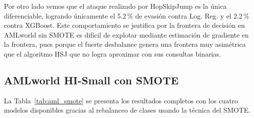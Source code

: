 Por otro lado vemos que el ataque realizado por HopSkipJump es la única diferenciable, logrando únicamente el 5.2\,\% de evasión contra Log. Reg. y el 2.2\,\% contra XGBoost. Este comportamiento se jsutifica por la frontera de decisión en AMLworld sin SMOTE es difícil de explotar mediante estimación de gradiente en la frontera, pues porque el fuerte desbalance genera una frontera muy asimétrica que el algoritmo HSJ que no logra aproximar con sus consultas binarias.

\subsection{AMLworld HI-Small con SMOTE}

La Tabla~\ref{tab:aml_smote} se presenta los resultados completos con los cuatro modelos disponibles gracias al rebalanceo de clases usando la técnica del SMOTE.

